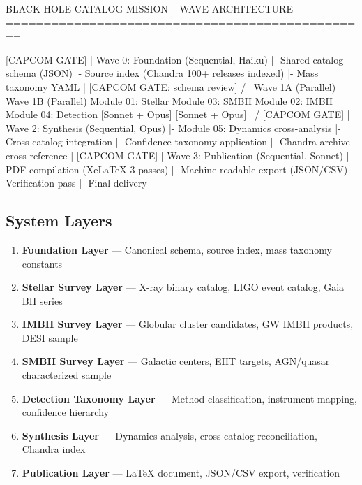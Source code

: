 \documentclass[11pt,letterpaper]{article}
\begin{document}
\begin{asciibox}
BLACK HOLE CATALOG MISSION -- WAVE ARCHITECTURE
================================================

                    [CAPCOM GATE]
                         |
  Wave 0: Foundation (Sequential, Haiku)
    |- Shared catalog schema (JSON)
    |- Source index (Chandra 100+ releases indexed)
    |- Mass taxonomy YAML
                         |
            [CAPCOM GATE: schema review]
            /                           \
  Wave 1A (Parallel)            Wave 1B (Parallel)
  Module 01: Stellar            Module 03: SMBH
  Module 02: IMBH               Module 04: Detection
  [Sonnet + Opus]               [Sonnet + Opus]
            \                           /
                    [CAPCOM GATE]
                         |
  Wave 2: Synthesis (Sequential, Opus)
    |- Module 05: Dynamics cross-analysis
    |- Cross-catalog integration
    |- Confidence taxonomy application
    |- Chandra archive cross-reference
                         |
                    [CAPCOM GATE]
                         |
  Wave 3: Publication (Sequential, Sonnet)
    |- PDF compilation (XeLaTeX 3 passes)
    |- Machine-readable export (JSON/CSV)
    |- Verification pass
    |- Final delivery
\end{asciibox}

\subsection{System Layers}

\begin{enumerate}
  \item \textbf{Foundation Layer} --- Canonical schema, source index, mass taxonomy constants
  \item \textbf{Stellar Survey Layer} --- X-ray binary catalog, LIGO event catalog, Gaia BH series
  \item \textbf{IMBH Survey Layer} --- Globular cluster candidates, GW IMBH products, DESI sample
  \item \textbf{SMBH Survey Layer} --- Galactic centers, EHT targets, AGN/quasar characterized sample
  \item \textbf{Detection Taxonomy Layer} --- Method classification, instrument mapping, confidence hierarchy
  \item \textbf{Synthesis Layer} --- Dynamics analysis, cross-catalog reconciliation, Chandra index
  \item \textbf{Publication Layer} --- LaTeX document, JSON/CSV export, verification
\end{enumerate}
\end{document}
